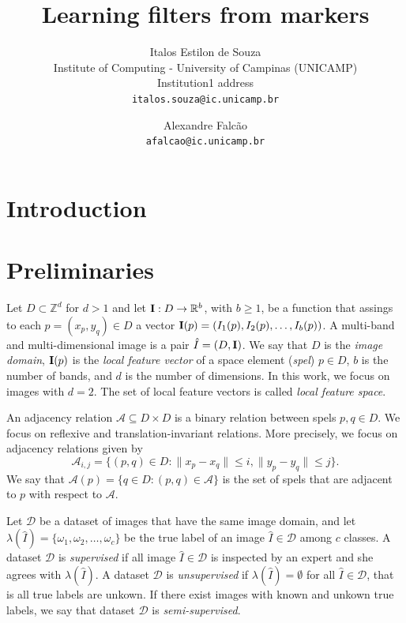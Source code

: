 \documentclass[10pt,twocolumn,letterpaper]{article}
\newcommand{\R}{\mathbb{R}}
\newcommand{\A}{\mathcal{A}}
\newcommand{\D}{\mathcal{D}}
\newcommand{\I}{\hat{I}}
\newcommand{\Z}{\mathbb{Z}}
\newcommand{\m}[1]{{\mathrm{\bf #1}}}
\begin{document}
\title{Learning filters from markers}
\author{Italos Estilon de Souza\\
Institute of Computing - University of Campinas (UNICAMP)\\
Institution1 address\\
{\tt\small italos.souza@ic.unicamp.br}
\and
Alexandre Falcão\\
{\tt\small afalcao@ic.unicamp.br}
}

\maketitle



\section{Introduction}

\section{Preliminaries}

Let $D \subset \Z^d$ for $d > 1$ and let $\m{I}: D \to \R^b$, with $b \ge 1$, be a function that assings to each $p = (x_p, y_q) \in D$ a vector $\m{I}(p) = (I_1(p), I_2(p), \ldots, I_b(p))$.
A multi-band and multi-dimensional image is a pair ${\hat{I} = (D, \m{I})}$. We say that $D$ is the \textit{image domain}, $\m{I}(p)$ is the \textit{local feature vector} of a space element (\textit{spel}) $p \in D$, $b$ is the number of bands, and $d$ is the number of dimensions. In this work, we focus on images with $d=2$. The set of local feature vectors is called \textit{local feature space}.

An adjacency relation $\A \subseteq D \times D$ is a binary relation between spels $p, q \in D$. We focus on reflexive and translation-invariant relations. More precisely, we focus on adjacency relations given by \[\A_{i,j} = \{ (p, q) \in D : \|x_p - x_q\| \le i, \|y_p - y_q\| \le j \}.\] We say that $\A(p) = \{q \in D : (p, q) \in \A\}$ is the set of spels that are adjacent to $p$ with respect to $\A$.

Let $\D$ be a dataset of images that have the same image domain, and let $\lambda(\I) = \{\omega_1, \omega_2, \ldots, \omega_c\}$ be the true label of an image $\I \in \D$ among $c$ classes. A dataset $\D$ is \textit{supervised} if all image $\I \in \D$ is inspected by an expert and she agrees with $\lambda(\I)$. A dataset $\D$ is \textit{unsupervised} if $\lambda(\I) = \emptyset$ for all $\I \in \D$, that is all true labels are unkown. If there exist images with known and unkown true labels, we say that dataset $\D$ is \textit{semi-supervised}.
\end{document}
